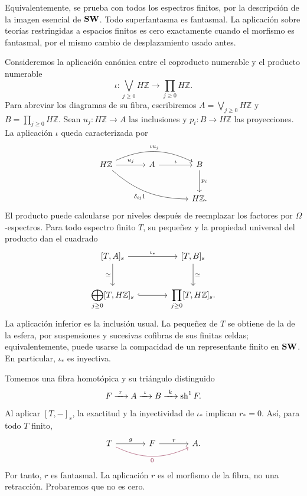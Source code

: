 Equivalentemente, se prueba con todos los espectros finitos, por la descripción de la imagen esencial de $\mathbf{SW}$. Todo superfantasma es fantasmal. La aplicación sobre teorías restringidas a espacios finitos es cero exactamente cuando el morfismo es fantasmal, por el mismo cambio de desplazamiento usado antes.

Consideremos la aplicación canónica entre el coproducto numerable y el producto numerable
\[
\iota\colon\bigvee_{j\ge0}H\mathbb Z\longrightarrow\prod_{j\ge0}H\mathbb Z.
\]
Para abreviar los diagramas de su fibra, escribiremos $A=\bigvee_{j\ge0}H\mathbb Z$ y $B=\prod_{j\ge0}H\mathbb Z$. Sean $u_j\colon H\mathbb Z\to A$ las inclusiones y $p_i\colon B\to H\mathbb Z$ las proyecciones. La aplicación $\iota$ queda caracterizada por
\[
\begin{tikzcd}[column sep=large,row sep=large]
H\mathbb Z\arrow[r,"u_j"]
\arrow[rr,bend left=25,"\iota u_j"]
\arrow[rrd,bend right=20,"\delta_{ij}1"']
&A\arrow[r,"\iota"]&B\arrow[d,"p_i"]\\
&&H\mathbb Z.
\end{tikzcd}
\]
El producto puede calcularse por niveles después de reemplazar los factores por $\Omega$-espectros. Para todo espectro finito $T$, su pequeñez y la propiedad universal del producto dan el cuadrado
\[
\begin{tikzcd}[column sep=large,row sep=large]
{[T,A]_s}\arrow[r,"\iota_*"]\arrow[d,"\simeq"']
&{[T,B]_s}\arrow[d,"\simeq"]\\
\displaystyle\bigoplus_{j\ge0}[T,H\mathbb Z]_s\arrow[r,hook]
&\displaystyle\prod_{j\ge0}[T,H\mathbb Z]_s.
\end{tikzcd}
\]
La aplicación inferior es la inclusión usual. La pequeñez de $T$ se obtiene de la de la esfera, por suspensiones y sucesivas cofibras de sus finitas celdas; equivalentemente, puede usarse la compacidad de un representante finito en $\mathbf{SW}$. En particular, $\iota_*$ es inyectiva.

Tomemos una fibra homotópica y su triángulo distinguido
\[
F\xrightarrow{\ r\ }A\xrightarrow{\ \iota\ }B
\xrightarrow{\ k\ }\operatorname{sh}^1F.
\]
Al aplicar $[T,-]_s$, la exactitud y la inyectividad de $\iota_*$ implican $r_*=0$. Así, para todo $T$ finito,
\[
\begin{tikzcd}[column sep=large]
T\arrow[r,"g"]\arrow[rr,bend right=25,"0"',color=rojoDiagramaCIMAT]
&F\arrow[r,"r"]&A.
\end{tikzcd}
\]
Por tanto, $r$ es fantasmal. La aplicación $r$ es el morfismo de la fibra, no una retracción. Probaremos que no es cero.

